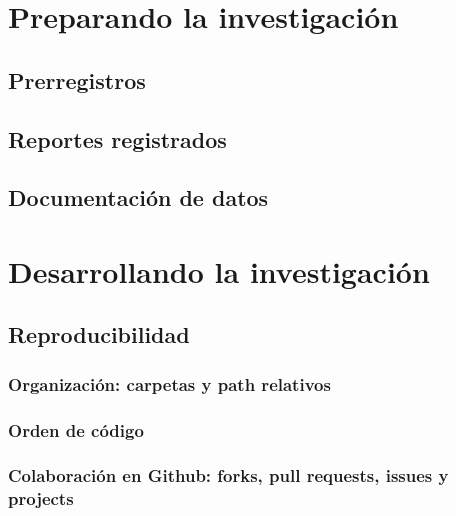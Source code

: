 \documentclass[11pt,]{book}
\begin{document}
\hypertarget{preparando-la-investigaciuxf3n}{%
\chapter{Preparando la investigación}\label{preparando-la-investigaciuxf3n}}

\hypertarget{prerregistros}{%
\section{Prerregistros}\label{prerregistros}}

\hypertarget{reportes-registrados}{%
\section{Reportes registrados}\label{reportes-registrados}}

\hypertarget{documentaciuxf3n-de-datos}{%
\section{Documentación de datos}\label{documentaciuxf3n-de-datos}}

\hypertarget{desarrollando-la-investigaciuxf3n}{%
\chapter{Desarrollando la investigación}\label{desarrollando-la-investigaciuxf3n}}

\hypertarget{reproducibilidad}{%
\section{Reproducibilidad}\label{reproducibilidad}}

\hypertarget{organizaciuxf3n-carpetas-y-path-relativos}{%
\subsection{Organización: carpetas y path relativos}\label{organizaciuxf3n-carpetas-y-path-relativos}}

\hypertarget{orden-de-cuxf3digo}{%
\subsection{Orden de código}\label{orden-de-cuxf3digo}}

\hypertarget{colaboraciuxf3n-en-github-forks-pull-requests-issues-y-projects}{%
\subsection{Colaboración en Github: forks, pull requests, issues y projects}\label{colaboraciuxf3n-en-github-forks-pull-requests-issues-y-projects}}
\end{document}
